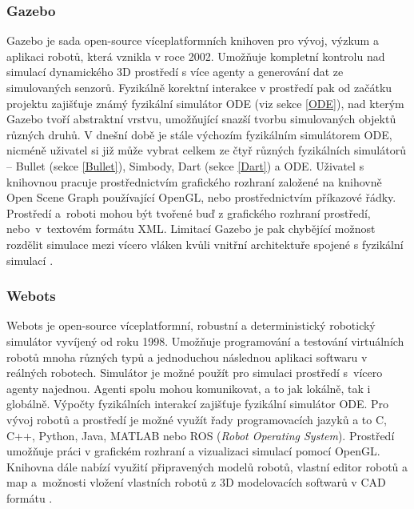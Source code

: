 \subsubsection{Gazebo} \label{Gazebo}
Gazebo \citep{gazeborobotics} je sada open-source víceplatformních knihoven pro
vývoj, výzkum a aplikaci robotů, která vznikla v roce 2002. Umožňuje kompletní
kontrolu nad simulací dynamického 3D prostředí s více agenty a generování dat
ze simulovaných senzorů. Fyzikálně korektní interakce v prostředí pak od
začátku projektu zajišťuje známý fyzikální simulátor ODE (viz sekce \ref{ODE}),
nad kterým Gazebo tvoří abstraktní vrstvu, umožňující snazší tvorbu
simulovaných objektů různých druhů. V dnešní době je stále výchozím fyzikálním
simulátorem ODE, nicméně uživatel si již může vybrat celkem ze čtyř různých
fyzikálních simulátorů -- Bullet (sekce \ref{Bullet}), Simbody, Dart (sekce
\ref{Dart}) a ODE. Uživatel s knihovnou pracuje prostřednictvím grafického
rozhraní založené na knihovně Open Scene Graph používající OpenGL, nebo
prostřednictvím příkazové řádky. Prostředí a~roboti mohou být tvořené buď z
grafického rozhraní prostředí, nebo~v~textovém formátu XML. Limitací Gazebo je
pak chybějící možnost rozdělit simulace mezi vícero vláken kvůli vnitřní
architektuře spojené s fyzikální simulací \citep{koenig2004design}. 

\subsubsection{Webots} \label{Webots}
Webots \citep{Webots} je open-source víceplatformní, robustní a deterministický
robotický simulátor vyvíjený od roku 1998. Umožňuje programování a testování
virtuálních robotů mnoha různých typů a jednoduchou následnou aplikaci softwaru
v reálných robotech. Simulátor je možné použít pro simulaci prostředí s~vícero
agenty najednou. Agenti spolu mohou komunikovat, a to jak lokálně, tak i
globálně. Výpočty fyzikálních interakcí zajišťuje fyzikální simulátor ODE. Pro
vývoj robotů a prostředí je možné využít řady programovacích jazyků a to C,
C++, Python, Java, MATLAB nebo ROS (\emph{Robot Operating System}). Prostředí
umožňuje práci v grafickém rozhraní a vizualizaci simulací pomocí OpenGL.
Knihovna dále nabízí využití připravených modelů robotů, vlastní editor robotů
a map a~možnosti vložení vlastních robotů z 3D modelovacích softwarů v CAD
formátu \citep{michel2004cyberbotics}.

